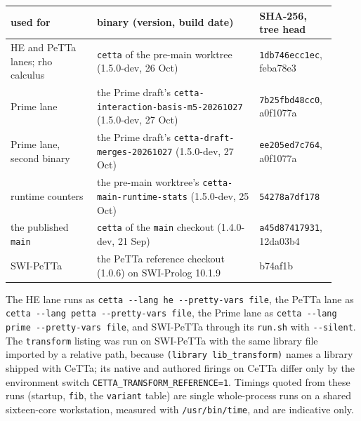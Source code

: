 \documentclass[11pt]{article}
\newcommand{\code}[1]{\texttt{#1}}
\newcommand{\PeTTa}{\textup{PeTTa}}
\newcommand{\HE}{\textup{HE}}
\newcommand{\CeTTa}{\textup{CeTTa}}
\begin{document}
\begin{center}
\footnotesize
\begin{tabular}{@{}p{0.25\linewidth}p{0.47\linewidth}p{0.20\linewidth}@{}}
\toprule
used for & binary (version, build date) & SHA-256, tree head \\
\midrule
\HE{} and \PeTTa{} lanes; rho calculus & \code{cetta} of the pre-main worktree (1.5.0-dev, 26 Oct) & \code{1db746ecc1ec}, feba78e3 \\
Prime lane & the Prime draft's \code{cetta-interaction-basis-}\allowbreak\code{m5-20261027} (1.5.0-dev, 27 Oct) & \code{7b25fbd48cc0}, a0f1077a \\
Prime lane, second binary & the Prime draft's \code{cetta-draft-merges-}\allowbreak\code{20261027} (1.5.0-dev, 27 Oct) & \code{ee205ed7c764}, a0f1077a \\
runtime counters & the pre-main worktree's \code{cetta-main-runtime-stats} (1.5.0-dev, 25 Oct) & \code{54278a7df178} \\
the published \code{main} & \code{cetta} of the \code{main} checkout (1.4.0-dev, 21 Sep) & \code{a45d87417931}, 12da03b4 \\
SWI-\PeTTa{} & the \PeTTa{} reference checkout (1.0.6) on SWI-Prolog 10.1.9 & b74af1b \\
\bottomrule
\end{tabular}
\end{center}

\noindent
The \HE{} lane runs as \code{cetta -{}-lang he -{}-pretty-vars file}, the \PeTTa{}
lane as \code{cetta -{}-lang petta -{}-pretty-vars file}, the Prime lane as
\code{cetta -{}-lang prime -{}-pretty-vars file}, and SWI-\PeTTa{} through its
\code{run.sh} with \code{-{}-silent}.  The \code{transform} listing was run on
SWI-\PeTTa{} with the same library file imported by a relative path, because
\code{(library lib\_transform)} names a library shipped with \CeTTa{}; its
native and authored firings on \CeTTa{} differ only by the environment switch
\code{CETTA\_TRANSFORM\_REFERENCE=1}.  Timings quoted from these runs (startup,
\code{fib}, the \code{variant} table) are single whole-process runs on a
shared sixteen-core workstation, measured with \code{/usr/bin/time}, and are
indicative only.
\end{document}
